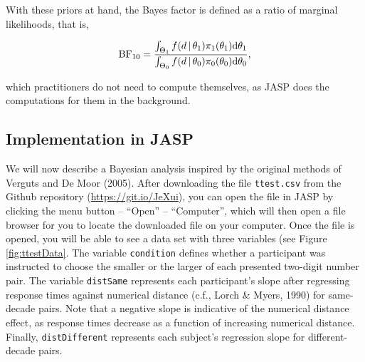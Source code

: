 \documentclass[english,,doc,floatsintext]{apa6}
\begin{document}
With these priors at hand, the Bayes factor is defined as a ratio of marginal likelihoods, that is,

\begin{align}
\textnormal{BF}_{10} = \frac{ \int_{\Theta_{1}} f(d \, | \, \theta_{1}) \pi_{1}(\theta_{1}) \textnormal{d} \theta_{1}}{\int_{\Theta_{0}} f(d \, | \, \theta_{0}) \pi_{0}(\theta_{0}) \textnormal{d} \theta_{0}},
\end{align}

which practitioners do not need to compute themselves, as JASP does the computations for them in the background.

\hypertarget{implementation-in-jasp}{%
\subsection{Implementation in JASP}\label{implementation-in-jasp}}

We will now describe a Bayesian analysis inspired by the original methods of Verguts and De Moor (2005). After downloading the file \texttt{ttest.csv} from the Github repository (\url{https://git.io/JeXui}), you can open the file in JASP by clicking the menu button -- \enquote{Open} -- \enquote{Computer}, which will then open a file browser for you to locate the downloaded file on your computer. Once the file is opened, you will be able to see a data set with three variables (see Figure \ref{fig:ttestData}. The variable \texttt{condition} defines whether a participant was instructed to choose the smaller or the larger of each presented two-digit number pair. The variable \texttt{distSame} represents each participant's slope after regressing response times against numerical distance (c.f., Lorch \& Myers, 1990) for same-decade pairs. Note that a negative slope is indicative of the numerical distance effect, as response times decrease as a function of increasing numerical distance. Finally, \texttt{distDifferent} represents each subject's regression slope for different-decade pairs.
\end{document}
